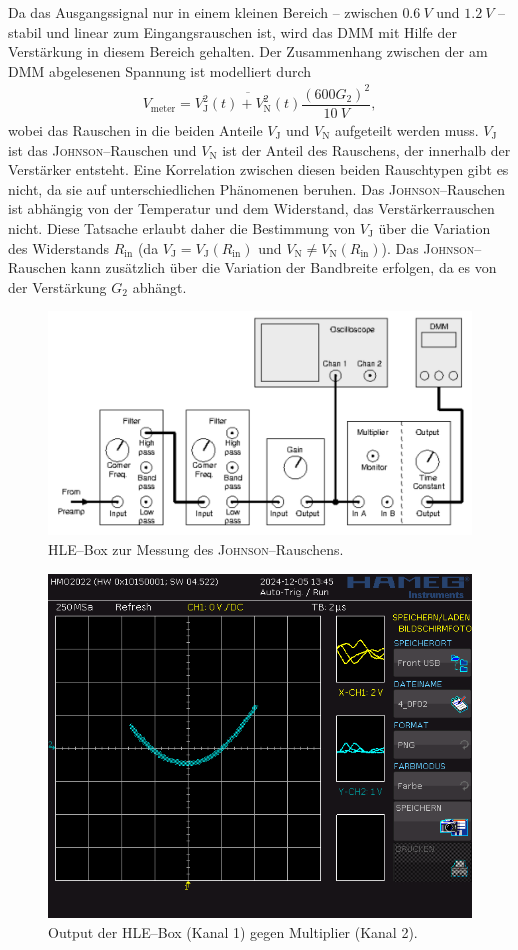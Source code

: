 \documentclass[sn-mathphys-num,iicol]{sn-jnl}
\theoremstyle{thmstyleone}
\theoremstyle{thmstyletwo}
\theoremstyle{thmstylethree}
\begin{document}
Da das Ausgangssignal nur in einem kleinen Bereich -- zwischen $\SI{0.6}{V}$ und $\SI{1.2}{V}$ -- stabil und linear zum Eingangsrauschen ist, wird das DMM mit Hilfe der Verstärkung in diesem Bereich gehalten.
Der Zusammenhang zwischen der am DMM abgelesenen Spannung ist modelliert durch
\begin{align}
	V_\text{meter}=\overline{V_\text{J}^2(t)+V_\text{N}^2(t)}\dfrac{\left(600G_2\right)^2}{\SI{10}{V}}
	,\end{align}
wobei das Rauschen in die beiden Anteile $V_\text{J}$ und $V_\text{N}$ aufgeteilt werden muss.
$V_\text{J}$ ist das \textsc{Johnson}--Rauschen und $V_\text{N}$ ist der Anteil des Rauschens, der innerhalb der Verstärker entsteht.
Eine Korrelation zwischen diesen beiden Rauschtypen gibt es nicht, da sie auf unterschiedlichen Phänomenen beruhen.
Das \textsc{Johnson}--Rauschen ist abhängig von der Temperatur und dem Widerstand, das Verstärkerrauschen nicht.
Diese Tatsache erlaubt daher die Bestimmung von $V_\text{J}$ über die Variation des Widerstands $R_\text{in}$ (da $V_\text{J}=V_\text{J}(R_\text{in})$ und $V_\text{N}\neq V_\text{N}(R_\text{in})$).
Das \textsc{Johnson}--Rauschen kann zusätzlich über die Variation der Bandbreite erfolgen, da es von der Verstärkung $G_2$ abhängt.

\begin{figure}[t]
	\centering
	\includegraphics[width=.5\textwidth]{425_schaltplan_messung_johnson.png}
	\caption{HLE--Box zur Messung des \textsc{Johnson}--Rauschens.\cite{anleitung425}} \label{fig:johnson_hle_messung}
\end{figure}

\begin{figure}[t]
	\centering
	\includegraphics[width=.5\textwidth]{../data/4_0F02.png}
	\caption{Output der HLE--Box (Kanal 1) gegen Multiplier (Kanal 2).} \label{fig:multiplier}
\end{figure}
\end{document}
